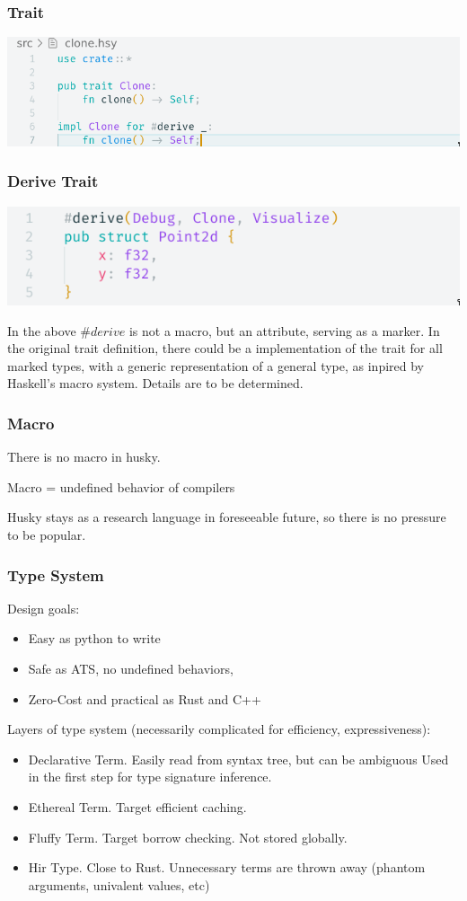 \documentclass{beamer}   	%
\theoremstyle{definition}
\begin{document}
\begin{frame}
\frametitle{Trait}
\includegraphics[width=\linewidth]{snapshots/husky_clone_derive_trait_side.png}
\end{frame}

\begin{frame}
\frametitle{Derive Trait}
\includegraphics[width=\linewidth]{snapshots/husky_clone_derive_example.png}

In the above $\#derive$ is not a macro, but an attribute, serving as a marker. In the original trait definition, there could be a implementation of the trait for all marked types, with a generic representation of a general type, as inpired by Haskell's macro system. Details are to be determined.
\end{frame}

\begin{frame}
\frametitle{Macro}
There is no macro in husky.

Macro = undefined behavior of compilers

Husky stays as a research language in foreseeable future, so there is no pressure to be popular.
\end{frame}

\begin{frame}
\frametitle{Type System}
Design goals:
\begin{itemize}
	\item Easy as python to write
	\item Safe as ATS, no undefined behaviors,
	\item Zero-Cost and practical as Rust and C++
\end{itemize}

Layers of type system (necessarily complicated for efficiency, expressiveness):
\begin{itemize}
	\item Declarative Term. Easily read from syntax tree, but can be ambiguous Used in the first step for type signature inference.
	\item Ethereal Term. Target efficient caching.
	\item Fluffy Term. Target borrow checking. Not stored globally.
	\item Hir Type. Close to Rust. Unnecessary terms are thrown away (phantom arguments, univalent values, etc)
\end{itemize}
\end{frame}
\end{document}

